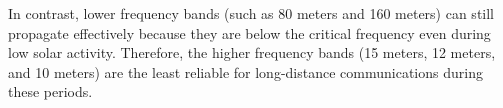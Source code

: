In contrast, lower frequency bands (such as 80 meters and 160 meters) can still propagate effectively because they are below the critical frequency even during low solar activity. Therefore, the higher frequency bands (15 meters, 12 meters, and 10 meters) are the least reliable for long-distance communications during these periods.

